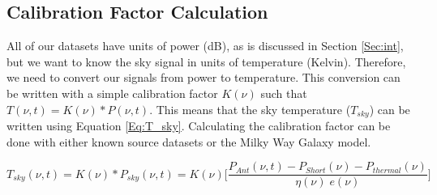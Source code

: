 \subsection{Calibration Factor Calculation}

All of our datasets have units of power (dB), as is discussed in Section \ref{Sec:int}, but we want to know the sky signal in units of temperature (Kelvin). Therefore, we need to convert our signals from power to temperature. This conversion can be written with a simple calibration factor $K(\nu)$ such that $T(\nu,t) = K(\nu)*P(\nu,t)$. This means that the sky temperature ($T_{sky}$) can be written using Equation \ref{Eq:T_sky}. Calculating the calibration factor can be done with either known source datasets or the Milky Way Galaxy model. 

\begin{equation} \label{Eq:T_sky}
T_{sky} (\nu, t) = K(\nu)* P_{sky}(\nu,t) = K (\nu) \Big[ \frac{P_{Ant}(\nu,t) - P_{Short} (\nu) - P_{thermal} (\nu)}{\eta (\nu) \; e (\nu) } \Big]
\end{equation}

